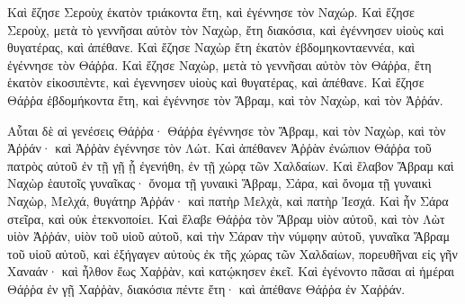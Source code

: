 {Καὶ ἔζησε Σεροὺχ ἑκατὸν τριάκοντα ἔτη, καὶ ἐγέννησε τὸν Ναχώρ.
Καὶ ἔζησε Σεροὺχ, μετὰ τὸ γεννῆσαι αὐτὸν τὸν Ναχὼρ, ἔτη διακόσια, καὶ ἐγέννησεν υἱοὺς καὶ θυγατέρας, καὶ ἀπέθανε.
Καὶ ἔζησε Ναχὼρ ἔτη ἑκατὸν ἑβδομηκονταεννέα, καὶ ἐγέννησε τὸν Θάῤῥα.
Καὶ ἔζησε Ναχὼρ, μετὰ τὸ γεννῆσαι αὐτὸν τὸν Θάῤῥα, ἔτη ἑκατὸν εἰκοσιπὲντε, καὶ ἐγεννησεν υἱοὺς καὶ θυγατέρας, καὶ ἀπέθανε.
Καὶ ἔζησε Θάῤῥα ἑβδομήκοντα ἔτη, καὶ ἐγέννησε τὸν Ἄβραμ, καὶ τὸν Ναχὼρ, καὶ τὸν Ἀῤῥάν.
\par }{\PP {}Αὗται δὲ αἱ γενέσεις Θάῤῥα· Θάῤῥα ἐγέννησε τὸν Ἅβραμ, καὶ τὸν Ναχὼρ, καὶ τὸν Ἀῤῥάν· καὶ Ἀῤῥὰν ἐγέννησε τὸν Λώτ.
Καὶ ἀπέθανεν Ἀῤῥὰν ἐνώπιον Θάῤῥα τοῦ πατρὸς αὐτοῦ ἐν τῇ γῇ ᾗ ἐγενήθη, ἐν τῇ χώρᾳ τῶν Χαλδαίων.
Καὶ ἔλαβον Ἅβραμ καὶ Ναχὼρ ἑαυτοῖς γυναῖκας· ὄνομα τῇ γυναικὶ Ἅβραμ, Σάρα, καὶ ὄνομα τῇ γυναικὶ Ναχὼρ, Μελχά, θυγάτηρ Ἀῤῥάν· καὶ πατὴρ Μελχὰ, καὶ πατὴρ Ἰεσχά.
Καὶ ἦν Σάρα στεῖρα, καὶ οὐκ ἐτεκνοποίει.
Καὶ ἔλαβε Θάῤῥα τὸν Ἅβραμ υἱὸν αὐτοῦ, καὶ τὸν Λὼτ υἱὸν Ἀῤῥάν, υἱὸν τοῦ υἱοῦ αὐτοῦ, καὶ τὴν Σάραν τὴν νύμφην αὐτοῦ, γυναῖκα Ἅβραμ τοῦ υἱοῦ αὐτοῦ, καὶ ἐξήγαγεν αὐτοὺς ἐκ τῆς χώρας τῶν Χαλδαίων, πορευθῆναι εἰς γῆν Χαναάν· καὶ ἦλθον ἕως Χαῤῥὰν, καὶ κατῴκησεν ἐκεῖ.
Καὶ ἐγένοντο πᾶσαι αἱ ἡμέραι Θάῤῥα ἐν γῇ Χαῤῥὰν, διακόσια πέντε ἔτη· καὶ ἀπέθανε Θάῤῥα ἐν Χαῤῥάν.

}
